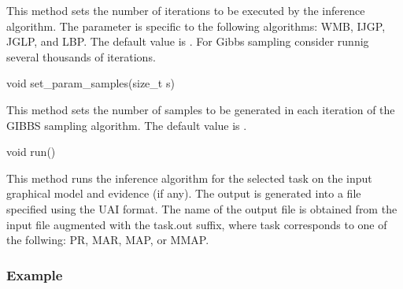 \begin{DoxyItemize}
\begin{DoxyVerb}
\end{DoxyVerb}
 This method sets the number of iterations to be executed by the inference algorithm. The parameter is specific to the following algorithms\+: {\ttfamily W\+M\+B}, {\ttfamily I\+J\+G\+P}, {\ttfamily J\+G\+L\+P}, and {\ttfamily L\+B\+P}. The default value is {}. For Gibbs sampling consider runnig several thousands of iterations. \begin{DoxyVerb}    void set_param_samples(size_t s)
\end{DoxyVerb}
 This method sets the number of samples to be generated in each iteration of the {\ttfamily G\+I\+B\+B\+S} sampling algorithm. The default value is {}. \begin{DoxyVerb}    void run()
\end{DoxyVerb}
 This method runs the inference algorithm for the selected task on the input graphical model and evidence (if any). The output is generated into a file specified using the U\+A\+I format. The name of the output file is obtained from the input file augmented with the {\ttfamily task.\+out} suffix, where {\ttfamily task} corresponds to one of the follwing\+: {\ttfamily P\+R}, {\ttfamily M\+A\+R}, {\ttfamily M\+A\+P}, or {\ttfamily M\+M\+A\+P}.
\end{DoxyItemize}

\subsubsection*{Example}

